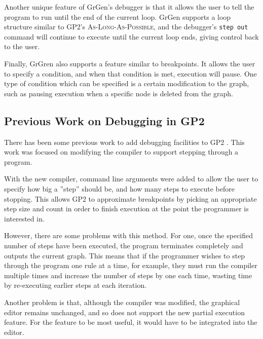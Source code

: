 \documentclass[authoryearcitations]{UoYCSproject}
\begin{document}
Another unique feature of GrGen's debugger is that it allows the user to tell the
program to run until the end of the current loop. GrGen supports a loop structure
similar to GP2's \textsc{As-Long-As-Possible}, and the debugger's \texttt{step out}
command will continue to execute until the current loop ends, giving control back
to the user.

Finally, GrGren also supports a feature similar to breakpoints. It allows the user
to specify a condition, and when that condition is met, execution will pause. One
type of condition which can be specified is a certain modification to the graph,
such as pausing execution when a specific node is deleted from the graph.


\subsection{Previous Work on Debugging in GP2}
\label{sec:PreviousWorkOnDebuggingInGP2}

There has been some previous work to add debugging facilities to GP2 \citep{taylor2016}.
This work was focused on modifying the compiler to support stepping through a
program.

With the new compiler, command line arguments were added to allow the user to
specify how big a ''step'' should be, and how many steps to execute before stopping.
This allows GP2 to approximate breakpoints by picking an appropriate step size
and count in order to finish execution at the point the programmer is interested in.

However, there are some problems with this method. For one, once the specified
number of steps have been executed, the program terminates completely and outputs
the current graph. This means that if the programmer wishes to step through the
program one rule at a time, for example, they must run the compiler multiple times
and increase the number of steps by one each time, wasting time by re-executing
earlier steps at each iteration.

Another problem is that, although the compiler was modified, the graphical editor
remains unchanged, and so does not support the new partial execution feature.
For the feature to be most useful, it would have to be integrated into the editor.


\clearpage

\end{document}

